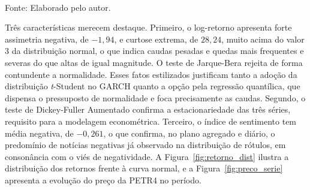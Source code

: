 \begin{table}[htpb]
\centering
\caption{Estatística descritiva das séries diárias (2018--2025).}
\label{tab:descritiva}
\vspace{0.2cm}
{\small \\ Fonte: Elaborado pelo autor.}
\end{table}

Três características merecem destaque. Primeiro, o log-retorno apresenta forte assimetria negativa, de $-1{,}94$, e curtose extrema, de $28{,}24$, muito acima do valor $3$ da distribuição normal, o que indica caudas pesadas e quedas mais frequentes e severas do que altas de igual magnitude. O teste de Jarque-Bera rejeita de forma contundente a normalidade. Esses fatos estilizados justificam tanto a adoção da distribuição \textit{t}-Student no GARCH quanto a opção pela regressão quantílica, que dispensa o pressuposto de normalidade e foca precisamente as caudas. Segundo, o teste de Dickey-Fuller Aumentado confirma a estacionariedade das três séries, requisito para a modelagem econométrica. Terceiro, o índice de sentimento tem média negativa, de $-0{,}261$, o que confirma, no plano agregado e diário, o predomínio de notícias negativas já observado na distribuição de rótulos, em consonância com o viés de negatividade. A Figura~\ref{fig:retorno_dist} ilustra a distribuição dos retornos frente à curva normal, e a Figura~\ref{fig:preco_serie} apresenta a evolução do preço da PETR4 no período.

